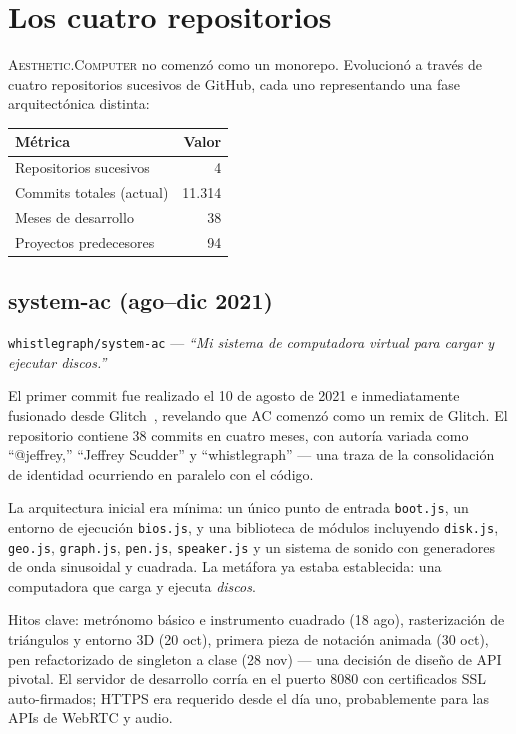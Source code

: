 \documentclass[10pt,letterpaper,twocolumn]{article}
\newcommand{\ac}{\textsc{Aesthetic.Computer}}
\begin{document}
\section{Los cuatro repositorios}

\ac{} no comenzó como un monorepo. Evolucionó a través de cuatro repositorios sucesivos de GitHub, cada uno representando una fase arquitectónica distinta:

\begin{table}[h]
\small
\centering
\begin{tabular}{lr}
\toprule
\textbf{Métrica} & \textbf{Valor} \\
\midrule
Repositorios sucesivos & 4 \\
Commits totales (actual) & 11.314 \\
Meses de desarrollo & 38 \\
Proyectos predecesores & 94 \\
\bottomrule
\end{tabular}
\end{table}

\subsection{system-ac (ago--dic 2021)}

\texttt{whistlegraph/system-ac} --- \emph{``Mi sistema de computadora virtual para cargar y ejecutar discos.''}

El primer commit fue realizado el 10 de agosto de 2021 e inmediatamente fusionado desde Glitch~\citep{glitch2017}, revelando que AC comenzó como un remix de Glitch. El repositorio contiene 38 commits en cuatro meses, con autoría variada como ``@jeffrey,'' ``Jeffrey Scudder'' y ``whistlegraph'' --- una traza de la consolidación de identidad ocurriendo en paralelo con el código.

La arquitectura inicial era mínima: un único punto de entrada \texttt{boot.js}, un entorno de ejecución \texttt{bios.js}, y una biblioteca de módulos incluyendo \texttt{disk.js}, \texttt{geo.js}, \texttt{graph.js}, \texttt{pen.js}, \texttt{speaker.js} y un sistema de sonido con generadores de onda sinusoidal y cuadrada. La metáfora ya estaba establecida: una computadora que carga y ejecuta \emph{discos}.

Hitos clave: metrónomo básico e instrumento cuadrado (18 ago), rasterización de triángulos y entorno 3D (20 oct), primera pieza de notación animada (30 oct), pen refactorizado de singleton a clase (28 nov) --- una decisión de diseño de API pivotal. El servidor de desarrollo corría en el puerto 8080 con certificados SSL auto-firmados; HTTPS era requerido desde el día uno, probablemente para las APIs de WebRTC y audio.
\end{document}
